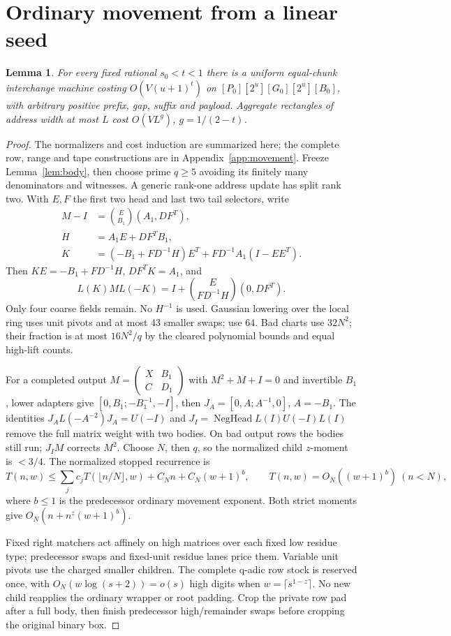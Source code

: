 \documentclass[11pt]{article}
\newcommand{\Oh}{O}
\newtheorem{lemma}[theorem]{Lemma}
\begin{document}
\section{Ordinary movement from a linear seed}
\begin{lemma}\label{lem:movement}
For every fixed rational $s_0<t<1$ there is a uniform equal-chunk interchange
machine costing $\Oh(V(u+1)^t)$ on
$[P_0][2^u][G_0][2^u][B_0]$, with arbitrary positive prefix, gap,
suffix and payload. Aggregate rectangles of address width at most $L$
cost $\Oh(VL^g)$, $g=1/(2-t)$.
\end{lemma}
\begin{proof}
The normalizers and cost induction are summarized here; the complete
row, range and tape constructions are in Appendix~\ref{app:movement}.
Freeze Lemma~\ref{lem:body}, then choose
prime $q\ge5$ avoiding its finitely many denominators and witnesses.
A generic rank-one address update has split rank two. With $E,F$ the
first two head and last two tail selectors, write
\[\begin{aligned}
M-I&=\binom E{B_1}(A_1,DF^T),\\
H&=A_1E+DF^TB_1,\\
K&=(-B_1+FD^{-1}H)E^T+FD^{-1}A_1(I-EE^T).
\end{aligned}\]
Then $KE=-B_1+FD^{-1}H$, $DF^TK=A_1$, and
\[L(K)ML(-K)=I+\binom E{FD^{-1}H}(0,DF^T).\]
Only four coarse fields remain. No $H^{-1}$ is used. Gaussian lowering
over the local ring uses unit pivots and at most 43 smaller swaps; use
64. Bad charts use $32N^2$; their fraction is at most $16N^2/q$ by the
cleared polynomial bounds and equal high-lift counts.

For a completed output $M=\left(\begin{smallmatrix}X&B_1\\C&D_1\end{smallmatrix}\right)$
with $M^2+M+I=0$ and invertible $B_1$, lower adapters give
$[0,B_1;-B_1^{-1},-I]$, then $J_A=[0,A;A^{-1},0]$, $A=-B_1$.
The identities $J_AL(-A^{-2})J_A=U(-I)$ and
$J_I=\operatorname{NegHead}L(I)U(-I)L(I)$ remove the full matrix weight
with two bodies. On bad output rows the bodies still run; $J_IM$
corrects $M^2$. Choose $N$, then $q$, so the normalized child $z$-moment
is $<3/4$. The normalized stopped recurrence is
\[T(n,w)\le\sum_jc_jT(\lfloor n/N\rfloor,w)+C_Nn+C_N(w+1)^b,
\qquad T(n,w)=\Oh_N((w+1)^b)\ (n<N),\]
where $b\le1$ is the predecessor ordinary movement exponent. Both strict
moments give $\Oh_N(n+n^z(w+1)^b)$.

Fixed right matchers act affinely on high matrices over each fixed low
residue type; predecessor swaps and fixed-unit residue lanes price
them. Variable unit pivots use the charged smaller children. The
complete q-adic row stock is reserved once, with
$\Oh_N(w\log(s+2))=o(s)$ high digits when $w=\lceil s^{1-z}\rceil$.
No new child reapplies the ordinary wrapper or root padding. Crop the
private row pad after a full body, then finish predecessor high/remainder
swaps before cropping the original binary box.


\end{proof}
\end{document}
